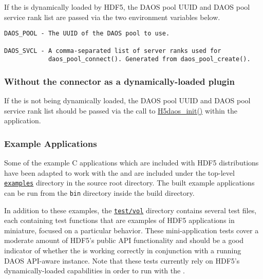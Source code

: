 \documentclass[../users_guide.tex]{subfiles}
\begin{document}
If the \dvc{} is dynamically loaded by HDF5, the DAOS pool UUID and
DAOS pool service rank list are passed via the two environment variables below.

\begin{verbatim}
DAOS_POOL - The UUID of the DAOS pool to use.

DAOS_SVCL - A comma-separated list of server ranks used for
            daos_pool_connect(). Generated from daos_pool_create().
\end{verbatim}

\subsubsection{Without the connector as a dynamically-loaded plugin}

If the \dvc{} is not being dynamically loaded, the DAOS pool UUID
and DAOS pool service rank list should be passed via the call to
\hyperref[ref:h5daos_init]{H5daos\_init()} within the application.

\subsubsection{Example Applications}

Some of the example C applications which are included with HDF5 distributions have been adapted to work with the \dvc{} and are included under the top-level \href{https://bitbucket.hdfgroup.org/projects/HDF5VOL/repos/daos-vol/browse/examples}{\texttt{examples}} directory in the \dvc{} source root directory. The built example applications can be run from the \texttt{bin} directory inside the build directory.

In addition to these examples, the \href{https://bitbucket.hdfgroup.org/projects/HDF5VOL/
repos/daos-vol/browse/test}{\texttt{test/vol}} directory contains several test
files, each containing test functions that are examples of HDF5 applications in
miniature, focused on a particular behavior. These mini-application tests cover a moderate 
amount of HDF5's public API functionality and should be a good indicator of
whether the \dvc{} is working correctly in conjunction with a
running DAOS API-aware instance. Note that these tests currently rely on HDF5's
dynamically-loaded \vc{} capabilities in order to run with the \dvc{}.
\end{document}
